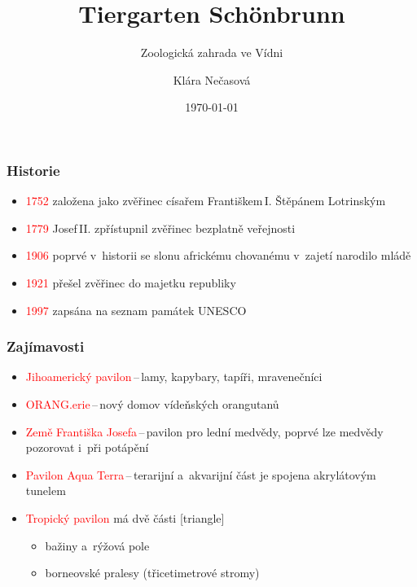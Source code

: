 \documentclass[pdf]{beamer}
\title{Tiergarten Sch\"{o}nbrunn}
\subtitle{Zoologická zahrada ve Vídni}
\author{Klára Nečasová}
\institute[FIT VUT]{Fakulta informačních technologií\\Vysoké učení technické v~Brně}
\date{\today}
\begin{document}
\begin{frame}
    \titlepage
\end{frame}

\begin{frame}
\frametitle{Historie}
\begin{itemize}
\item{\textcolor{red}{1752} založena jako zvěřinec císařem Františkem\,I. Štěpánem Lotrinským}
\item{\textcolor{red}{1779} Josef\,II. zpřístupnil zvěřinec bezplatně veřejnosti}
\item{\textcolor{red}{1906} poprvé v~historii se slonu africkému chovanému v~zajetí narodilo mládě}
\item{\textcolor{red}{1921} přešel zvěřinec do majetku republiky}
\item{\textcolor{red}{1997} zapsána na seznam památek UNESCO}
\end{itemize}
\end{frame}

\begin{frame}
\frametitle{Zajímavosti}
\begin{itemize}
\item{\textcolor{red}{Jihoamerický pavilon}\,--\,lamy, kapybary, tapíři, mravenečníci}
\item{\textcolor{red}{ORANG.erie}\,--\,nový domov vídeňských orangutanů }
\item{\textcolor{red}{Země Františka Josefa}\,--\,pavilon pro lední medvědy, poprvé lze medvědy pozorovat i~při potápění}
\item{\textcolor{red}{Pavilon Aqua Terra}\,--\,terarijní a~akvarijní část je spojena akrylátovým tunelem}
\item{\textcolor{red}{Tropický pavilon} má dvě části}
[triangle]
\begin{itemize}
\item{bažiny a~rýžová pole}
\item{borneovské pralesy (třicetimetrové stromy)}
\end{itemize}
\end{itemize}
\end{frame}
\end{document}
